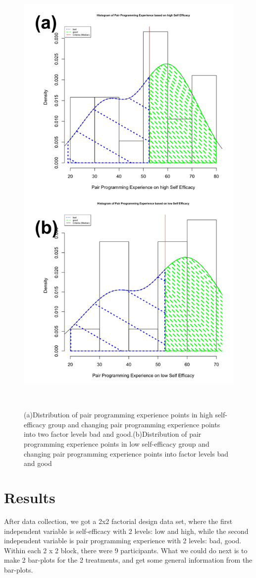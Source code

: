 \documentclass{sigchi}
\begin{document}
\begin{figure}
\centering
  \includegraphics[width=0.6\columnwidth]{figures/hist2}
  \caption{(a)Distribution of pair programming experience points in high self-efficacy group and changing pair programming experience points  into two factor levels bad and good.(b)Distribution of pair programming experience points in low self-efficacy group and changing pair programming experience points  into  factor levels bad and good }~\label{fig:figure2}
\end{figure}


\section{Results}

After data collection, we got a 2x2 factorial design data set, where the first independent variable is self-efficacy with 2 levels: low and high, while the second independent variable is pair programming experience with 2 levels: bad, good. Within each 2 x 2 block, there were 9 participants. What we could do next is to make 2 bar-plots for the 2 treatments, and get some general information from the bar-plots.
\end{document}
